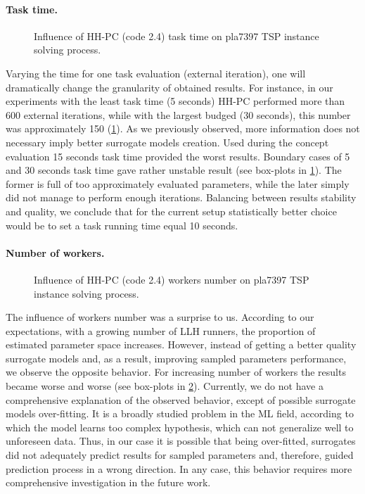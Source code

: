 \paragraph{Task time.}
\begin{figure}[h]
	\centering
	\vspace{-20pt}
	
	\caption{Influence of HH-PC (code 2.4) task time on pla7397 TSP instance solving process.}
	\vspace{-5pt}
	\label{eval:2:pict:task time}
\end{figure}
Varying the time for one task evaluation (external iteration), one will dramatically change the granularity of obtained results. For instance, in our experiments with the least task time (5 seconds) HH-PC performed more than 600 external iterations, while with the largest budged (30 seconds), this number was approximately 150 (\cref{eval:2:pict:task time}). As we previously observed, more information does not necessary imply better surrogate models creation. Used during the concept evaluation 15 seconds task time provided the worst results. Boundary cases of 5 and 30 seconds task time gave rather unstable result (see box-plots in \cref{eval:2:pict:task time}). The former is full of too approximately evaluated parameters, while the later simply did not manage to perform enough iterations. Balancing between results stability and quality, we conclude that for the current setup statistically better choice would be to set a task running time equal 10 seconds. 

\paragraph{Number of workers.}
\begin{figure}[h]
	\centering
	\vspace{-20pt}
	
	\caption{Influence of HH-PC (code 2.4) workers number on pla7397 TSP instance solving process.}
	\vspace{-5pt}
	\label{eval:2:pict:number of workers}
\end{figure}
The influence of workers number was a surprise to us. According to our expectations, with a growing number of LLH runners, the proportion of estimated parameter space increases. However, instead of getting a better quality surrogate models and, as a result, improving sampled parameters performance, we observe the opposite behavior. For increasing number of workers the results became worse and worse (see box-plots in \cref{eval:2:pict:number of workers}). Currently, we do not have a comprehensive explanation of the observed behavior, except of possible surrogate models over-fitting. It is a broadly studied problem in the ML field, according to which the model learns too complex hypothesis, which can not generalize well to unforeseen data. Thus, in our case it is possible that being over-fitted, surrogates did not adequately predict results for sampled parameters and, therefore, guided prediction process in a wrong direction. In any case, this behavior requires more comprehensive investigation in the future work.

